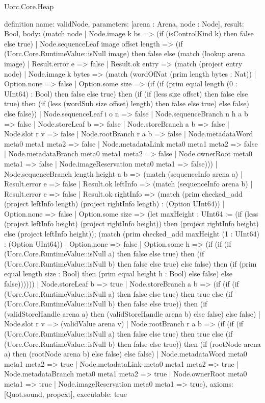 \begin{lexlean}{Uorc.Core.Heap}
\begin{semanticmodule}
definition{
  name: validNode,
  parameters: [arena : Arena, node : Node],
  result: Bool,
  body: (match node
    | Node.image k bs => (if (isControlKind k) then false else true)
    | Node.sequenceLeaf image offset length => (if (Uorc.Core.RuntimeValue::isNull image) then false else (match (lookup arena image)
      | Result.error e => false
      | Result.ok entry => (match (project entry node)
        | Node.image k bytes => (match (wordOfNat (prim length bytes : Nat))
          | Option.none => false
          | Option.some size => (if (if (prim equal length (0 : UInt64) : Bool) then false else true) then (if (if (less size offset) then false else true) then (if (less (wordSub size offset) length) then false else true) else false) else false))
        | Node.sequenceLeaf i o n => false
        | Node.sequenceBranch n h a b => false
        | Node.storeLeaf b => false
        | Node.storeBranch a b => false
        | Node.slot r v => false
        | Node.rootBranch r a b => false
        | Node.metadataWord meta0 meta1 meta2 => false
        | Node.metadataLink meta0 meta1 meta2 => false
        | Node.metadataBranch meta0 meta1 meta2 => false
        | Node.ownerRoot meta0 meta1 => false
        | Node.imageReservation meta0 meta1 => false)))
    | Node.sequenceBranch length height a b => (match (sequenceInfo arena a)
      | Result.error e => false
      | Result.ok leftInfo => (match (sequenceInfo arena b)
        | Result.error e => false
        | Result.ok rightInfo => (match (prim checked_add (project leftInfo length) (project rightInfo length) : (Option UInt64))
          | Option.none => false
          | Option.some size => (let maxHeight : UInt64 := (if (less (project leftInfo height) (project rightInfo height)) then (project rightInfo height) else (project leftInfo height)); (match (prim checked_add maxHeight (1 : UInt64) : (Option UInt64))
            | Option.none => false
            | Option.some h => (if (if (if (Uorc.Core.RuntimeValue::isNull a) then false else true) then (if (Uorc.Core.RuntimeValue::isNull b) then false else true) else false) then (if (prim equal length size : Bool) then (prim equal height h : Bool) else false) else false))))))
    | Node.storeLeaf b => true
    | Node.storeBranch a b => (if (if (if (Uorc.Core.RuntimeValue::isNull a) then false else true) then true else (if (Uorc.Core.RuntimeValue::isNull b) then false else true)) then (if (validStoreHandle arena a) then (validStoreHandle arena b) else false) else false)
    | Node.slot r v => (validValue arena v)
    | Node.rootBranch r a b => (if (if (if (Uorc.Core.RuntimeValue::isNull a) then false else true) then true else (if (Uorc.Core.RuntimeValue::isNull b) then false else true)) then (if (rootNode arena a) then (rootNode arena b) else false) else false)
    | Node.metadataWord meta0 meta1 meta2 => true
    | Node.metadataLink meta0 meta1 meta2 => true
    | Node.metadataBranch meta0 meta1 meta2 => true
    | Node.ownerRoot meta0 meta1 => true
    | Node.imageReservation meta0 meta1 => true),
  axioms: [Quot.sound, propext],
  executable: true
}


\end{semanticmodule}
\end{lexlean}
